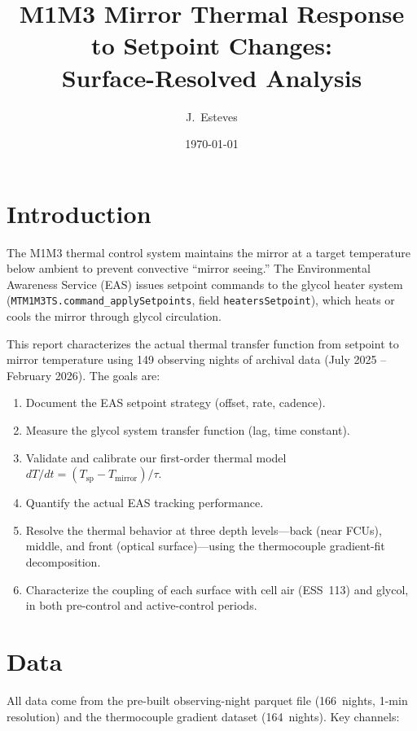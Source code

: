 \documentclass[11pt]{article}
\title{M1M3 Mirror Thermal Response to Setpoint Changes:\\
Surface-Resolved Analysis}
\author{J.\ Esteves}
\date{\today}
\begin{document}
\maketitle

\section{Introduction}

The M1M3 thermal control system maintains the mirror at a target
temperature below ambient to prevent convective ``mirror seeing.''
The Environmental Awareness Service (EAS) issues setpoint commands to
the glycol heater system (\texttt{MTM1M3TS.command\_applySetpoints},
field \texttt{heatersSetpoint}), which heats or cools the mirror
through glycol circulation.

This report characterizes the actual thermal transfer function from
setpoint to mirror temperature using 149 observing nights of archival
data (July 2025 -- February 2026).  The goals are:
\begin{enumerate}
  \item Document the EAS setpoint strategy (offset, rate, cadence).
  \item Measure the glycol system transfer function (lag, time constant).
  \item Validate and calibrate our first-order thermal model
    $dT/dt = (T_\mathrm{sp} - T_\mathrm{mirror})/\tau$.
  \item Quantify the actual EAS tracking performance.
  \item Resolve the thermal behavior at three depth levels---back
    (near FCUs), middle, and front (optical surface)---using the
    thermocouple gradient-fit decomposition.
  \item Characterize the coupling of each surface with cell air
    (ESS~113) and glycol, in both pre-control and active-control
    periods.
\end{enumerate}

\section{Data}

All data come from the pre-built observing-night parquet file
(166~nights, 1-min resolution) and the thermocouple gradient dataset
(164~nights).  Key channels:
\end{document}
